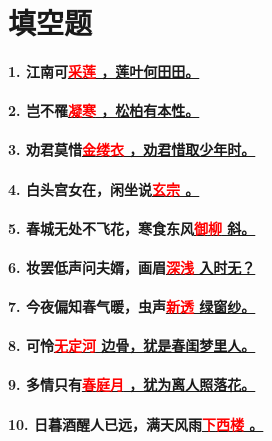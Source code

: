 \documentclass[UTF8]{ctexart} %
\begin{document}
\section{填空题}
\paragraph{1. 江南可\uline{\quad \textcolor{red}{采}\textcolor{red}{莲} \quad ，莲叶何田田。}}
\paragraph{2. 岂不罹\uline{\quad \textcolor{red}{凝}\textcolor{red}{寒} \quad ，松柏有本性。}}
\paragraph{3. 劝君莫惜\uline{\quad \textcolor{red}{金}\textcolor{red}{缕}\textcolor{red}{衣} \quad ，劝君惜取少年时。}}
\paragraph{4. 白头宫女在，闲坐说\uline{\quad \textcolor{red}{玄}\textcolor{red}{宗} \quad 。}}
\paragraph{5. 春城无处不飞花，寒食东风\uline{\quad \textcolor{red}{御}\textcolor{red}{柳} \quad 斜。}}
\paragraph{6. 妆罢低声问夫婿，画眉\uline{\quad \textcolor{red}{深}\textcolor{red}{浅} \quad 入时无？}}
\paragraph{7. 今夜偏知春气暖，虫声\uline{\quad \textcolor{red}{新}\textcolor{red}{透} \quad 绿窗纱。}}
\paragraph{8. 可怜\uline{\quad \textcolor{red}{无}\textcolor{red}{定}\textcolor{red}{河} \quad 边骨，犹是春闺梦里人。}}
\paragraph{9. 多情只有\uline{\quad \textcolor{red}{春}\textcolor{red}{庭}\textcolor{red}{月} \quad ，犹为离人照落花。}}
\paragraph{10. 日暮酒醒人已远，满天风雨\uline{\quad \textcolor{red}{下}\textcolor{red}{西}\textcolor{red}{楼} \quad 。}}
\end{document}
